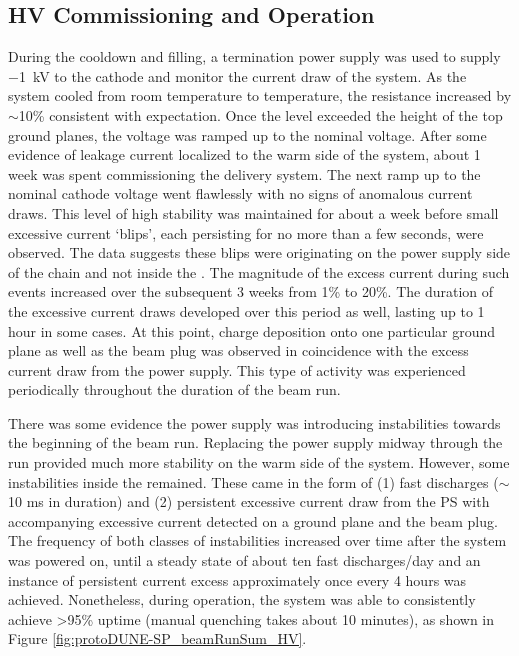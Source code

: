 \subsection{HV Commissioning and Operation}
\label{sec:fdsp-hv-commissioning-operation}
During the cooldown and  filling, a  termination power supply was used to supply $-$\SI{1}{kV} to the cathode and monitor the current draw of the system.
As the system cooled from room temperature to  temperature, the resistance increased by $\sim$10\% consistent with expectation.
Once the  level exceeded the height of the top ground planes, the voltage was ramped up to the nominal voltage.
After some evidence of leakage current localized to the warm side of the system, about 1 week was spent commissioning the  delivery system.
The next ramp up to the nominal cathode voltage went flawlessly with no signs of anomalous current draws.
This level of high stability was maintained for about a week before small excessive current `blips', each persisting for no more than a few seconds, were observed.
The data suggests these blips were originating on the power supply side of the chain and not inside the .
The magnitude of the excess current during such events increased over the subsequent 3 weeks from 1\% to 20\%.
The duration of the excessive current draws developed over this period as well, lasting up to 1 hour in some cases.
At this point, charge deposition onto one particular ground plane as well as the beam plug was observed in coincidence with the excess current draw from the power supply.
This type of activity was experienced periodically throughout the duration of the  beam run.

There was some evidence the power supply was introducing instabilities towards the beginning of the beam run.
Replacing the power supply midway through the run  provided much more stability on the warm side of the  system.
However, some instabilities inside the  remained.
These came in the form of (1) fast discharges ($\sim$10 ms in duration) and (2) persistent excessive current draw from the PS with accompanying excessive current detected on a ground plane and the beam plug.
The frequency of both classes of instabilities increased over time after the system was powered on, until a steady state of about ten fast discharges/day and an instance of persistent current excess approximately once every 4 hours was achieved.
Nonetheless, during operation, the  system was able to consistently achieve >95\% uptime (manual quenching takes about 10 minutes), as shown in Figure \ref{fig:protoDUNE-SP_beamRunSum_HV}.

